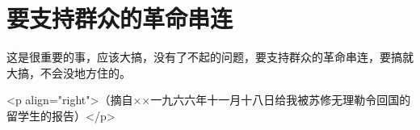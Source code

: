 \section[要支持群众的革命串连（一九六六年十一月）]{要支持群众的革命串连}


这是很重要的事，应该大搞，没有了不起的问题，要支持群众的革命串连，要搞就大搞，不会没地方住的。

<p align="right">（摘自××一九六六年十一月十八日给我被苏修无理勒令回国的留学生的报告）</p>


